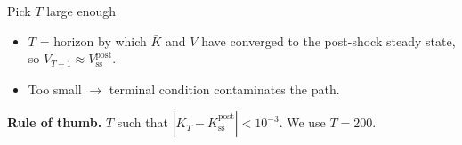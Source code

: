 \documentclass[10pt,aspectratio=169]{beamer}
\begin{document}
\begin{frame}{Pick $T$ large enough}

\begin{itemize}
  \item $T$ = horizon by which $\bar K$ and $V$ have converged to the post-shock steady state, so $V_{T+1} \approx V^{\mathrm{post}}_{\mathrm{ss}}$.
  \item Too small $\to$ terminal condition contaminates the path.
\end{itemize}

\vspace{0.4em}

\textbf{Rule of thumb.} $T$ such that $|\bar K_T - \bar K^{\mathrm{post}}_{\mathrm{ss}}| < 10^{-3}$. We use $T = 200$.

\end{frame}
\end{document}
